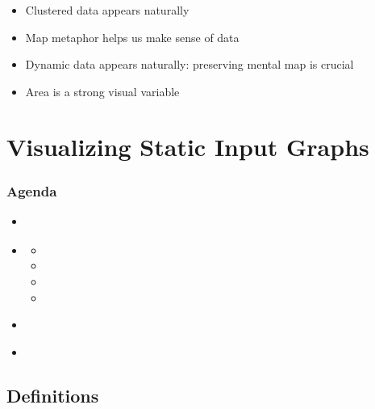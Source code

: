 \documentclass[t,18pt]{beamer}
\newcommand{\light}[1]{\textcolor{black!40}{#1}}
\begin{document}
\begin{frame}
  \frametitle{}
  \begin{itemize}
    \item Clustered data appears naturally
    \item Map metaphor helps us make sense of data
    \item Dynamic data appears naturally: preserving mental map is crucial
    \item Area is a strong visual variable
  \end{itemize}
\end{frame}





\section{Visualizing Static Input Graphs}
\label{sect:visualizing-static-input-graphs}

\begin{frame}
  \frametitle{Agenda}
  \begin{itemize}
    \item \light{}
    \item {} \begin{itemize}
      \item {}
      \item {}
      \item {}
      \item {}
    \end{itemize}
    \item \light{}
    \item \light{}
  \end{itemize}
\end{frame}

\subsection{Definitions}
\label{subsect:definitions}
\end{document}
